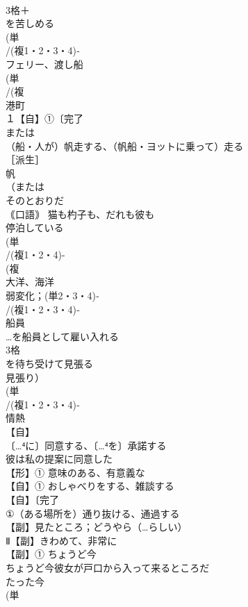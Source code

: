 \documentclass[8pt]{extreport}
\begin{document}
\begin{CJK}{UTF8}{min}
\\	3格＋
\\	を苦しめる
\\	(単
\\	/(複1・2・3・4)‐
\\	フェリー、渡し船 
\\	(単
\\	/(複
\\	港町 
\\	１【自】①〔完了
\\	または
\\	（船・人が）帆走する、（帆船・ヨットに乗って）走る 
\\	［派生］ 
\\	帆
\\	（または
\\	そのとおりだ
\\	｟口語｠ 猫も杓子も、だれも彼も
\\	停泊している
\\	(単
\\	/(複1・2・4)-
\\	(複
\\	大洋、海洋 
\\	弱変化；(単2・3・4)‐
\\	/(複1・2・3・4)‐
\\	船員 
\\	…を船員として雇い入れる
\\	3格 
\\	を待ち受けて見張る 
\\	見張り）
\\	(単
\\	/(複1・2・3・4)‐
\\	情熱 
\\	【自】
\\	〔…⁴に〕同意する、〔…⁴を〕承諾する 
\\	彼は私の提案に同意した
\\	【形】① 意味のある、有意義な
\\	【自】① おしゃべりをする、雑談する 
\\	【自】〔完了
\\	①（ある場所を）通り抜ける、通過する
\\	【副】見たところ；どうやら（…らしい） 
\\	Ⅱ【副】きわめて、非常に
\\	【副】① ちょうど今 
\\	ちょうど今彼女が戸口から入って来るところだ 
\\	たった今 
\\	(単

\end{CJK}
\end{document}
